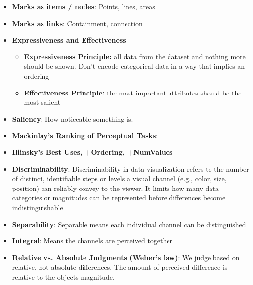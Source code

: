 \documentclass{report}
\begin{document}
\begin{itemize}
\begin{itemize}
                \item \textbf{Containment} $\implies$ hierarchical relationship
            \end{itemize}
        \item \textbf{Marks as items / nodes}: Points, lines, areas
        \item \textbf{Marks as links}: Containment, connection
        \item \textbf{Expressiveness and Effectiveness}: 
            \begin{itemize}
                \item \textbf{Expressiveness Principle:} all data from the dataset and nothing more should be shown. Don’t encode categorical data in a way that implies an ordering 
                \item \textbf{Effectiveness Principle:} the most important attributes should be the most salient
            \end{itemize}
        \item \textbf{Saliency}: How noticeable something is.
        \item \textbf{Mackinlay's Ranking of Perceptual Tasks}: 
            \bigbreak \noindent 
        \item \textbf{Iliinsky's Best Uses, +Ordering, +NumValues}
            \bigbreak \noindent 
        \item \textbf{Discriminability}: Discriminability in data visualization refers to the number of distinct, identifiable steps or levels a visual channel (e.g., color, size, position) can reliably convey to the viewer. It limits how many data categories or magnitudes can be represented before differences become indistinguishable
        \item \textbf{Separability}: Separable means each individual channel can be distinguished
        \item \textbf{Integral}: Means the channels are perceived together
        \item \textbf{Relative vs. Absolute Judgments (Weber's law)}: We judge based on relative, not absolute differences. The amount of perceived difference is relative to the objects magnitude. 


    \end{itemize}


    \pagebreak 
\end{document}
